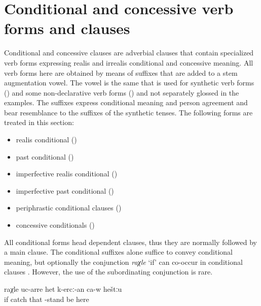 \section{Conditional and concessive verb forms and clauses}
\label{cpt:conditionalconcessiveclauses}

Conditional and concessive clauses are adverbial clauses that contain specialized verb forms expressing realis and irrealis conditional and concessive meaning. All verb forms here are obtained by means of suffixes that are added to a stem augmentation vowel. The vowel is the same that is used for synthetic verb forms () and some non-declarative verb forms () and not separately glossed in the examples. The suffixes express conditional meaning and person agreement and bear resemblance to the suffixes of the synthetic tenses. The following forms are treated in this section:
%
\begin{itemize}
	\item	realis conditional () 
	\item	past conditional ()
	\item	imperfective realis conditional ()
	\item	imperfective past conditional ()
	\item	periphrastic conditional clauses ()
	\item	concessive conditionals ()
\end{itemize}

All conditional forms head dependent clauses, thus they are normally followed by a main clause. The conditional suffixes alone suffice to convey conditional meaning, but optionally the conjunction \textit{raχle} `if' can co-occur in conditional clauses . However, the use of the subordinating conjunction is rare.

\begin{exe}
	\ex	\label{ex:If (he) caught him, he must stand there}
	\gll	raχle	uc-arre	het	k-ercː-an	ca-w	heštːu\\
		if	catch	that	-stand	be	here\\
	\glt	{}
\end{exe}

